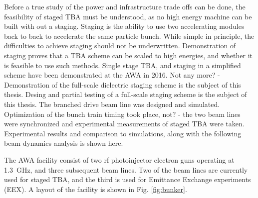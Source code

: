 \documentclass{iitthesis}
\newcommand{\lsnote}[1]{\textsf{{\color{violet}{ LS note:}   #1 }}}
\newcommand{\nrnote}[1]{\textsf{{\color{blue}{ NN note:}   #1 }}}
\begin{document}
Before a true study of the power and infrastructure trade offs 
can be done, the feasibility of staged TBA must be understood, 
as no high energy machine can be built with out a staging.
Staging is the ability to use two accelerating modules back to back to accelerate 
the same particle bunch. While simple in principle, the difficulties 
to achieve staging should not be underwritten. Demonstration of staging proves 
that a TBA scheme can be scaled to high energies, and whether it is 
feasible to use such methods. Single stage TBA, and staging 
in a simplified scheme have been demonstrated at the AWA in 2016.
\nrnote{Not any more? - Demonstration of the full-scale dielectric staging scheme is the 
	subject of this thesis.} 
Desing and partial testing of a full-scale staging scheme is the 
subject of this thesis. The branched drive beam line was designed and 
simulated. 
Optimization of the bunch train timing took place, \nrnote{not? - the two 
	beam lines were synchronized and experimental measurements 
	of staged TBA were taken. }
Experimental results and comparison to simulations, along 
with the following beam dynamics analysis is shown here.

 \label{sec:facility}

The AWA facility consist of two rf photoinjector electron guns operating
at \SI{1.3}{GHz}, and three subsequent beam lines. 
Two of the beam lines are currently used for staged TBA, and the
third is used for Emittance Exchange experiments (EEX). A layout of
the facility is shown in Fig. \ref{fig:bunker}. 
\end{document}
